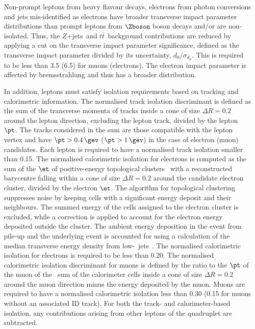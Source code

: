 \documentclass[final,3p,times,twocolumn]{elsarticle}
\newcommand{\Zjets}{$Z$+jets}
\begin{document}
  Non-prompt leptons from heavy flavour decays,
  electrons from photon conversions and jets mis-identified as electrons  
  have broader transverse impact parameter distributions than prompt leptons from 
  $\Zboson$ boson decays and/or are non-isolated. Thus, the 
  \Zjets\ and $t\bar{t}$~background contributions are
  reduced by applying a cut on the transverse impact parameter
  significance, defined as the transverse impact parameter divided by its
  uncertainty, $d_0/\sigma_{d_0}$. This is required to be less than 3.5 (6.5)
  for muons (electrons). The electron impact parameter is affected by
  bremsstrahlung and thus has a broader distribution. 
  
  In addition, leptons must satisfy
  isolation requirements based on tracking and calorimetric information. 
  The normalised track isolation discriminant
  is defined as the sum of the transverse momenta of tracks inside a
  cone of size $\Delta R=0.2$ around the lepton direction, excluding the lepton
  track, divided by the lepton $\pt$. The tracks considered in the sum
  are those compatible with the lepton vertex and have $\pt>0.4\,\gev$ ($\pt>1\,\gev$) 
  in the case of electron (muon) candidates. 
  Each lepton is required to have a normalised track isolation smaller than 0.15. 
  The normalised calorimetric isolation for electrons is
  computed as the sum of the $\et$ of positive-energy topological
  clusters~\cite{Lampl:1099735} with a reconstructed barycentre falling within a cone of
  size $\Delta R=0.2$ around the candidate electron cluster, divided by the
  electron $\et$. The algorithm for topological clustering suppresses noise by keeping cells
  with a significant energy deposit and their neighbours.
  The summed energy of the cells assigned to the electron cluster
  is excluded, while a correction is applied to account for the electron energy deposited outside the cluster. 
  The ambient energy deposition in the event from pile-up and 
  the underlying event is accounted for using a calculation of the median
  transverse energy density from
  low-\pt~jets~\cite{Cacciari:2007fd,Cacciari:2011ma}. The normalised
  calorimetric isolation for electrons is required to be less than 0.20. 
  The normalised calorimetric isolation discriminant for muons is defined
  by the ratio to the $\pt$ of the muon of the \et~sum of the calorimeter cells inside a
  cone of size  $\Delta R=0.2$ around the muon direction minus the energy deposited by the muon.
  Muons are required to have a normalised
  calorimetric isolation less than 0.30 (0.15 for muons without
  an associated ID track). For both the track- and calorimeter-based
  isolation, any contributions arising from other leptons of the
  quadruplet are subtracted.
\end{document}
